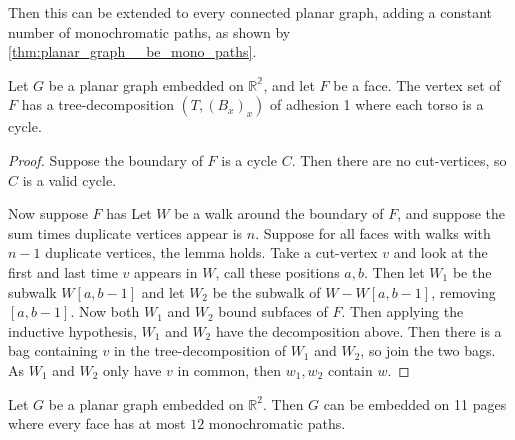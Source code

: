 Then this can be extended to every connected planar graph, adding a constant number of monochromatic paths, as shown by \cref{thm:planar_graph__be_mono_paths}.

\begin{lemma}\label{lemma:decomposition_faces}
	Let $G$ be a planar graph embedded on $\mathbb{R^2}$, and let $F$ be a face. The vertex set of $F$ has a tree-decomposition $(T, (B_x)_x)$ of adhesion 1 where each torso is a cycle.
\end{lemma}

\begin{proof}
	Suppose the boundary of $F$ is a cycle $C$. Then there are no cut-vertices, so $C$ is a valid cycle.

	Now suppose $F$ has Let $W$ be a walk around the boundary of $F$, and suppose the sum times duplicate vertices appear is $n$. Suppose for all faces with walks with $n-1$ duplicate vertices, the lemma holds. Take a cut-vertex $v$ and look at the first and last time $v$ appears in $W$, call these positions $a, b$. Then let $W_1$ be the subwalk $W[a, b-1]$ and let $W_2$ be the subwalk of $W - W[a, b-1]$, removing $[a, b-1]$. Now both $W_1$ and $W_2$ bound subfaces of $F$. Then applying the inductive hypothesis, $W_1$ and $W_2$ have the decomposition above. Then there is a bag containing $v$ in the tree-decomposition of $W_1$ and $W_2$, so join the two bags. As $W_1$ and $W_2$ only have $v$ in common, then $w_1, w_2$ contain $w$. 
\end{proof}


\begin{theorem}\label{thm:planar_graph__be_mono_paths}
	Let \( G \) be a planar graph embedded on $\mathbb{R}^2$. Then $G$ can be embedded on 11 pages where every face has at most $12$ monochromatic paths.
\end{theorem}

